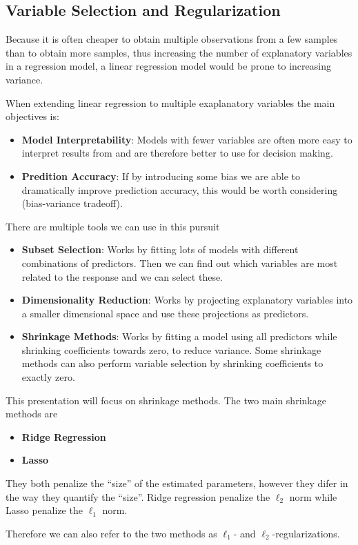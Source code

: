 \documentclass[aspectratio=169,10pt]{beamer}
\begin{document}
\subsection{Variable Selection and Regularization}
\begin{frame}{\secname}{\subsecname}
  Because it is often cheaper to obtain multiple observations from a few samples than to obtain more samples, thus increasing the number of explanatory variables in a regression model, a linear regression model would be prone to increasing variance.
  
  When extending linear regression to multiple exaplanatory variables the main objectives is:
  \begin{itemize}
    \item \textbf{Model Interpretability}: Models with fewer variables are often more easy to interpret results from and are therefore better to use for decision making.
    \item \textbf{Predition Accuracy}: If by introducing some bias we are able to dramatically improve prediction accuracy, this would be worth considering (bias-variance tradeoff).
  \end{itemize}
\end{frame}

\begin{frame}{\secname}{\subsecname}
  There are multiple tools we can use in this pursuit
    \begin{itemize}
      \item \textbf{Subset Selection}: Works by fitting lots of models with different combinations of predictors. Then we can find out which variables are most related to the response and we can select these.
      \item \textbf{Dimensionality Reduction}: Works by projecting explanatory variables into a smaller dimensional space and use these projections as predictors.
      \item \textbf{Shrinkage Methods}: Works by fitting a model using all predictors while shrinking coefficients towards zero, to reduce variance. Some shrinkage methods can also perform variable selection by shrinking coefficients to exactly zero. 
    \end{itemize}
\end{frame}

\begin{frame}{\secname}{\subsecname}
  This presentation will focus on shrinkage methods.
  The two main shrinkage methods are
  \begin{itemize}
    \item \textbf{Ridge Regression}
    \item \textbf{Lasso}
  \end{itemize}
  They both penalize the ``size'' of the estimated parameters, however they difer in the way they quantify the ``size''.
  Ridge regression penalize the $\ell_2$ norm while Lasso penalize the $\ell_1$ norm.

  Therefore we can also refer to the two methods as $\ell_1$- and $\ell_2$-regularizations.
\end{frame}
\end{document}
